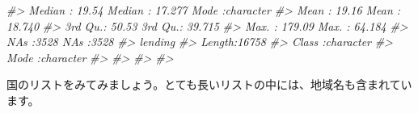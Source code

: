 \documentclass[
  xelatex, ja=standard]{bxjsbook}
\newenvironment{Shaded}{\begin{snugshade}}{\end{snugshade}}
\newcommand{\CommentTok}[1]{\textcolor[rgb]{0.56,0.35,0.01}{\textit{#1}}}
\theoremstyle{definition}
\theoremstyle{definition}
\theoremstyle{definition}
\theoremstyle{definition}
\theoremstyle{remark}
\begin{document}
\begin{Shaded}
\begin{Highlighting}[]
\CommentTok{\#\textgreater{}  Median :  19.54   Median : 17.277   Mode  :character  }
\CommentTok{\#\textgreater{}  Mean   :  19.16   Mean   : 18.740                     }
\CommentTok{\#\textgreater{}  3rd Qu.:  50.53   3rd Qu.: 39.715                     }
\CommentTok{\#\textgreater{}  Max.   : 179.09   Max.   : 64.184                     }
\CommentTok{\#\textgreater{}  NA\textquotesingle{}s   :3528      NA\textquotesingle{}s   :3528                        }
\CommentTok{\#\textgreater{}    lending         }
\CommentTok{\#\textgreater{}  Length:16758      }
\CommentTok{\#\textgreater{}  Class :character  }
\CommentTok{\#\textgreater{}  Mode  :character  }
\CommentTok{\#\textgreater{}                    }
\CommentTok{\#\textgreater{}                    }
\CommentTok{\#\textgreater{}                    }
\CommentTok{\#\textgreater{} }
\end{Highlighting}
\end{Shaded}

国のリストをみてみましょう。とても長いリストの中には、地域名も含まれています。
\end{document}
